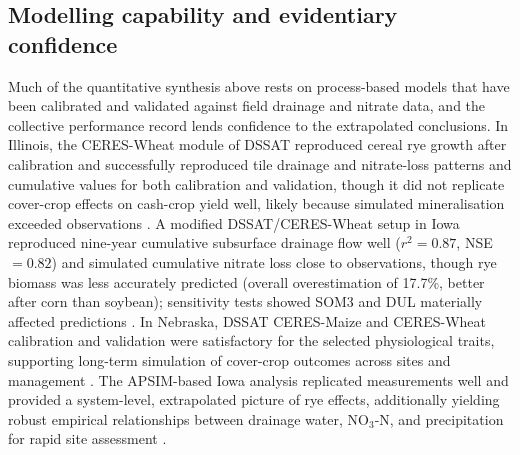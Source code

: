 \documentclass[11pt]{article}
\begin{document}
\subsection{Modelling capability and evidentiary confidence}
Much of the quantitative synthesis above rests on process-based models that have been calibrated and validated against field drainage and nitrate data, and the collective performance record lends confidence to the extrapolated conclusions. In Illinois, the CERES-Wheat module of DSSAT reproduced cereal rye growth after calibration and successfully reproduced tile drainage and nitrate-loss patterns and cumulative values for both calibration and validation, though it did not replicate cover-crop effects on cash-crop yield well, likely because simulated mineralisation exceeded observations \parencite{Gupta2022}. A modified DSSAT/CERES-Wheat setup in Iowa reproduced nine-year cumulative subsurface drainage flow well ($r^2 = 0.87$, NSE $= 0.82$) and simulated cumulative nitrate loss close to observations, though rye biomass was less accurately predicted (overall overestimation of 17.7\%, better after corn than soybean); sensitivity tests showed SOM3 and DUL materially affected predictions \parencite{Chatterjee2025}. In Nebraska, DSSAT CERES-Maize and CERES-Wheat calibration and validation were satisfactory for the selected physiological traits, supporting long-term simulation of cover-crop outcomes across sites and management \parencite{Birru2023}. The APSIM-based Iowa analysis replicated measurements well and provided a system-level, extrapolated picture of rye effects, additionally yielding robust empirical relationships between drainage water, NO$_3$-N, and precipitation for rapid site assessment \parencite{MartinezFeria2016}.
\end{document}

